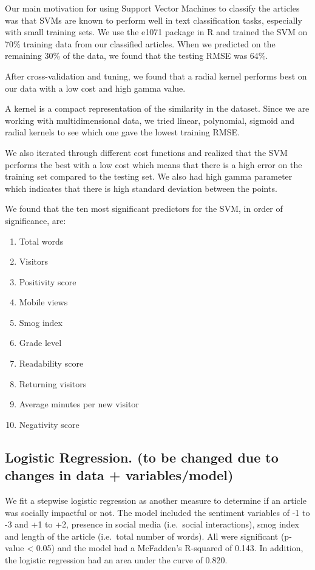 \documentclass[10pt,letterpaper]{article}
\providecommand{\tightlist}{%
  \setlength{\itemsep}{0pt}\setlength{\parskip}{0pt}}
\begin{document}
Our main motivation for using Support Vector Machines to classify the
articles was that SVMs are known to perform well in text classification
tasks, especially with small training sets. We use the e1071 package in
R and trained the SVM on 70\% training data from our classified
articles. When we predicted on the remaining 30\% of the data, we found
that the testing RMSE was 64\%.

After cross-validation and tuning, we found that a radial kernel
performs best on our data with a low cost and high gamma value.

A kernel is a compact representation of the similarity in the dataset.
Since we are working with multidimensional data, we tried linear,
polynomial, sigmoid and radial kernels to see which one gave the lowest
training RMSE.

We also iterated through different cost functions and realized that the
SVM performs the best with a low cost which means that there is a high
error on the training set compared to the testing set. We also had high
gamma parameter which indicates that there is high standard deviation
between the points.

We found that the ten most significant predictors for the SVM, in order
of significance, are:

\begin{enumerate}
\def\labelenumi{\arabic{enumi}.}
\tightlist
\item
  Total words
\item
  Visitors
\item
  Positivity score
\item
  Mobile views
\item
  Smog index
\item
  Grade level
\item
  Readability score
\item
  Returning visitors
\item
  Average minutes per new visitor
\item
  Negativity score
\end{enumerate}

\subsection{Logistic Regression. (to be changed due to changes in data +
variables/model)}\label{logistic-regression.-to-be-changed-due-to-changes-in-data-variablesmodel}

We fit a stepwise logistic regression as another measure to determine if
an article was socially impactful or not. The model included the
sentiment variables of -1 to -3 and +1 to +2, presence in social media
(i.e.~social interactions), smog index and length of the article
(i.e.~total number of words). All were significant (p-value \textless{}
0.05) and the model had a McFadden's R-squared of 0.143. In addition,
the logistic regression had an area under the curve of 0.820.
\end{document}
